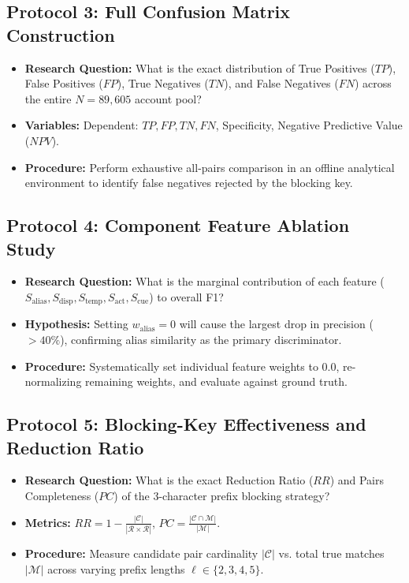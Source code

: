 \subsection{Protocol 3: Full Confusion Matrix Construction}
\begin{itemize}[noitemsep]
    \item \textbf{Research Question:} What is the exact distribution of True Positives ($TP$), False Positives ($FP$), True Negatives ($TN$), and False Negatives ($FN$) across the entire $N=89,605$ account pool?
    \item \textbf{Variables:} Dependent: $TP, FP, TN, FN$, Specificity, Negative Predictive Value ($NPV$).
    \item \textbf{Procedure:} Perform exhaustive all-pairs comparison in an offline analytical environment to identify false negatives rejected by the blocking key.
\end{itemize}

\subsection{Protocol 4: Component Feature Ablation Study}
\begin{itemize}[noitemsep]
    \item \textbf{Research Question:} What is the marginal contribution of each feature ($S_{\text{alias}}, S_{\text{disp}}, S_{\text{temp}}, S_{\text{act}}, S_{\text{cue}}$) to overall F1?
    \item \textbf{Hypothesis:} Setting $w_{\text{alias}} = 0$ will cause the largest drop in precision ($>40\%$), confirming alias similarity as the primary discriminator.
    \item \textbf{Procedure:} Systematically set individual feature weights to $0.0$, re-normalizing remaining weights, and evaluate against ground truth.
\end{itemize}

\subsection{Protocol 5: Blocking-Key Effectiveness and Reduction Ratio}
\begin{itemize}[noitemsep]
    \item \textbf{Research Question:} What is the exact Reduction Ratio ($RR$) and Pairs Completeness ($PC$) of the 3-character prefix blocking strategy?
    \item \textbf{Metrics:} $RR = 1 - \frac{|\mathcal{C}|}{|\mathcal{R} \times \mathcal{R}|}$, $PC = \frac{|\mathcal{C} \cap \mathcal{M}|}{|\mathcal{M}|}$.
    \item \textbf{Procedure:} Measure candidate pair cardinality $|\mathcal{C}|$ vs. total true matches $|\mathcal{M}|$ across varying prefix lengths $\ell \in \{2, 3, 4, 5\}$.
\end{itemize}

